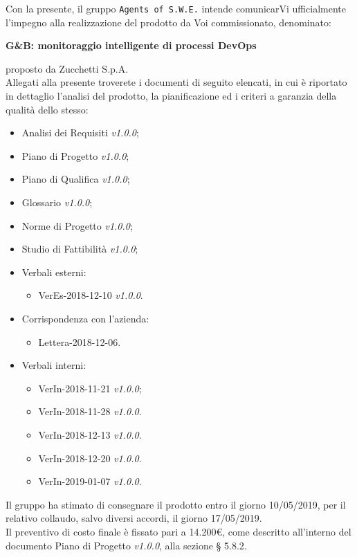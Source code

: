 \documentclass[11pt, a4paper]{letter} %
\begin{document}
\begin{letter}
Con la presente, il gruppo \texttt{Agents of S.W.E.} intende comunicarVi ufficialmente l'impegno alla realizzazione del prodotto da Voi commissionato, denominato:
\begin{center}
	\textbf{G\&B: monitoraggio intelligente di processi DevOps}
\end{center}
proposto da Zucchetti S.p.A.\\
Allegati alla presente troverete i documenti di seguito elencati, in cui è riportato in dettaglio l'analisi del prodotto, la pianificazione ed i criteri a garanzia della qualità dello stesso:
\begin{itemize}
	\item Analisi dei Requisiti \textit{v1.0.0};
	\item Piano di Progetto \textit{v1.0.0};
	\item Piano di Qualifica \textit{v1.0.0};
	\item Glossario \textit{v1.0.0};
	\item Norme di Progetto \textit{v1.0.0};	
	\item Studio di Fattibilità \textit{v1.0.0};
	\item Verbali esterni: 
		\begin{itemize}
			\item VerEs-2018-12-10 \textit{v1.0.0}.
		\end{itemize}
	\item Corrispondenza con l'azienda: 
		\begin{itemize}
			\item Lettera-2018-12-06.
		\end{itemize}
	\item Verbali interni: 
		\begin{itemize}
			\item VerIn-2018-11-21 \textit{v1.0.0};
			\item VerIn-2018-11-28 \textit{v1.0.0}.
			\item VerIn-2018-12-13 \textit{v1.0.0}.
			\item VerIn-2018-12-20 \textit{v1.0.0}.
			\item VerIn-2019-01-07 \textit{v1.0.0}.
		\end{itemize}
\end{itemize}
Il gruppo ha stimato di consegnare il prodotto entro il giorno 10/05/2019, per il relativo collaudo, salvo diversi accordi, il giorno 17/05/2019.\\  
Il preventivo di costo finale è fissato pari a 14.200€, come descritto all'interno del documento Piano di Progetto \textit{v1.0.0}, alla sezione § 5.8.2.\\

\end{letter}
\end{document}
